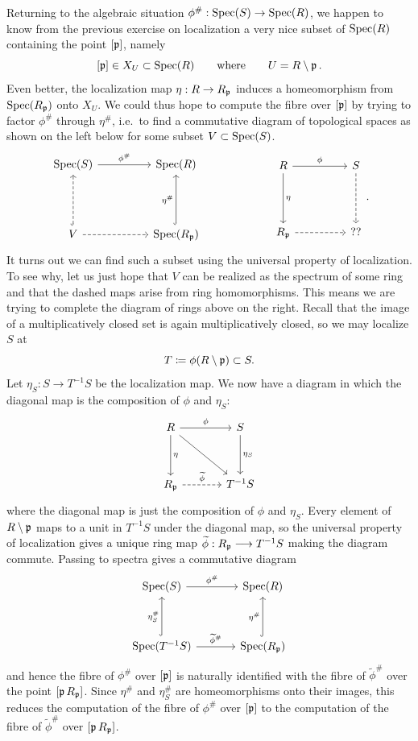 \documentclass[Notebook.tex]{subfiles}
\begin{document}
Returning to the algebraic situation $\phi^{\#}:\operatorname{Spec}(S) \to \operatorname{Spec}(R)$, we happen to know from the previous exercise on localization a very nice subset of $\operatorname{Spec}(R)$ containing the point $[\operatorname{\mathfrak{p}}]$, namely
\[
[\operatorname{\mathfrak{p}}]\in X_U\subset \operatorname{Spec}(R)
\qquad\text{where}\qquad
U=R\setminus \operatorname{\mathfrak{p}}.
\]
Even better, the localization map $\eta:R\to R_{\operatorname{\mathfrak{p}}}$ induces a homeomorphism from $\operatorname{Spec}(R_{\operatorname{\mathfrak{p}}})$ onto $X_U$. We could thus hope to compute the fibre over $[\operatorname{\mathfrak{p}}]$ by trying to factor $\phi^{\#}$ through $\eta^{\#}$, i.e.\ to find a commutative diagram of topological spaces as shown on the left below for some subset $V\subset \operatorname{Spec}(S)$.
\[
\begin{tikzcd}[row sep = 4.5em, column sep =4.5em]
    \Spec(S) \arrow[r, "\phi^{\#}"] & \Spec(R) \\
    V \arrow[u, dashed, hookrightarrow] \arrow[r, dashed] & \Spec(R_{\fp}) \arrow[u, hookrightarrow, "\eta^{\#}"]
\end{tikzcd}
\qquad\qquad\qquad
\begin{tikzcd}[row sep = 4.5em, column sep =4.5em]
    R \arrow[r, "\phi"] \arrow[d, "\eta"] & S \arrow[d, dashed] \\
    R_{\fp} \arrow[r, dashed] & ??
\end{tikzcd}.
\]
It turns out we can find such a subset using the universal property of localization. To see why, let us just hope that $V$ can be realized as the spectrum of some ring and that the dashed maps arise from ring homomorphisms. This means we are trying to complete the diagram of rings above on the right. Recall that the image of a multiplicatively closed set is again multiplicatively closed, so we may localize $S$ at
\[
T\coloneqq \phi(R\setminus\operatorname{\mathfrak{p}})\subset S.
\]
Let $\eta_S:S\to T^{-1}S$ be the localization map. We now have a diagram in which the diagonal map is the composition of $\phi$ and $\eta_S$:
\[
\begin{tikzcd}[row sep = 3.5em, column sep =3.5em]
    R \arrow[r, "\phi"] \arrow[d, "\eta"] \arrow[dr] & S \arrow[d, "\eta_S"] \\
    R_{\fp} \arrow[r, dashed, "\widetilde{\phi}"] & T^{-1}S
\end{tikzcd}
\]
where the diagonal map is just the composition of $\phi$ and $\eta_S$. Every element of $R\setminus \operatorname{\mathfrak{p}}$ maps to a unit in $T^{-1}S$ under the diagonal map, so the universal property of localization gives a unique ring map $\widetilde{\phi}:R_{\operatorname{\mathfrak{p}}}\longrightarrow T^{-1}S$ making the diagram commute. Passing to spectra gives a commutative diagram
\[
\begin{tikzcd}[row sep = 3.5em, column sep =3.5em]
    \Spec(S) \arrow[r, "\phi^{\#}"] & \Spec(R) \\
    \Spec(T^{-1}S) \arrow[u, hookrightarrow, "\eta_S^{\#}"] \arrow[r, "\widetilde{\phi}^{\#}"] & \Spec(R_{\fp}) \arrow[u, hookrightarrow, "\eta^{\#}"]
\end{tikzcd}
\]
and hence the fibre of $\phi^{\#}$ over $[\operatorname{\mathfrak{p}}]$ is naturally identified with the fibre of $\widetilde{\phi}^{\#}$ over the point $[\operatorname{\mathfrak{p}} R_{\operatorname{\mathfrak{p}}}]$. Since $\eta^{\#}$ and $\eta_S^{\#}$ are homeomorphisms onto their images, this reduces the computation of the fibre of $\phi^{\#}$ over $[\operatorname{\mathfrak{p}}]$ to the computation of the fibre of $\widetilde{\phi}^{\#}$ over $[\operatorname{\mathfrak{p}} R_{\operatorname{\mathfrak{p}}}]$.
\end{document}
